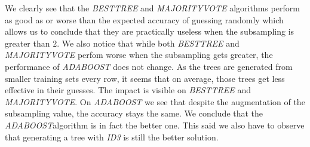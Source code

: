 \documentclass[8pt]{extarticle}
\begin{document}
	We clearly see that the \emph{BESTTREE} and \emph{MAJORITYVOTE} algorithms perform as good as or worse than the expected accuracy of guessing randomly which allows us to conclude that they are practically useless when the subsampling is greater than $2$.  We also notice that while both \emph{BESTTREE} and \emph{MAJORITYVOTE} perfom worse when the subsampling gets greater, the performance of \emph{ADABOOST} does not change. As the trees are generated from smaller training sets every row, it seems that on average, those trees get less effective in their guesses. The impact is visible on \emph{BESTTREE} and \emph{MAJORITYVOTE}. On \emph{ADABOOST} we see that despite the augmentation of the subsampling value, the accuracy stays the same. We conclude that the \emph{ADABOOST}algorithm is in fact the better one. This said we also have to observe that generating a tree with \emph{ID3} is still the better solution.
\end{document}
